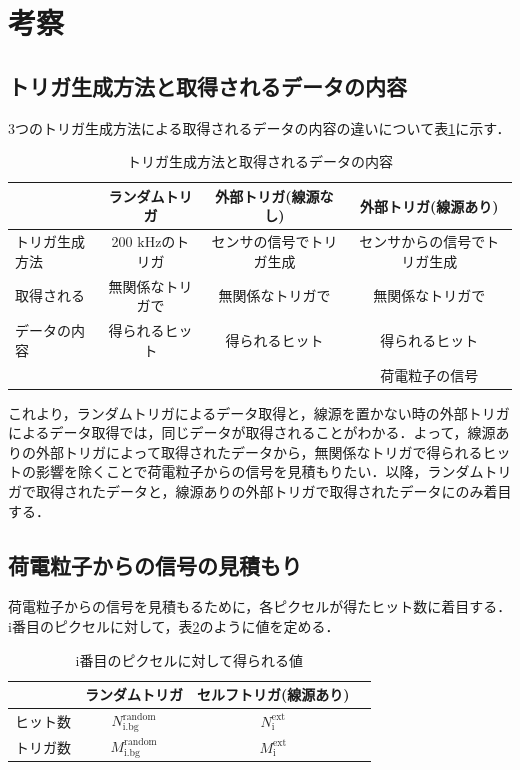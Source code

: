 \section{考察}
\label{sec:extsum}
\subsection*{トリガ生成方法と取得されるデータの内容}
3つのトリガ生成方法による取得されるデータの内容の違いについて表\ref{tab:extdata}に示す．

\begin{table}[h]
  \centering
  \caption{トリガ生成方法と取得されるデータの内容}
  \label{tab:extdata}
  \begin{tabular} {l|ccc} \hline 
    & ランダムトリガ & 外部トリガ(線源なし) & 外部トリガ(線源あり) \\ \hline \hline
    トリガ生成方法 & 200 $\mathrm{kHz}$のトリガ & センサの信号でトリガ生成 & センサからの信号でトリガ生成 \\ \hline
    取得される & 無関係なトリガで & 無関係なトリガで & 無関係なトリガで\\
    データの内容 & 得られるヒット & 得られるヒット & 得られるヒット \\
    & & & 荷電粒子の信号\\ \hline
  \end{tabular}
  \label{tab:extdata}
\end{table}

これより，ランダムトリガによるデータ取得と，線源を置かない時の外部トリガによるデータ取得では，同じデータが取得されることがわかる．よって，線源ありの外部トリガによって取得されたデータから，無関係なトリガで得られるヒットの影響を除くことで荷電粒子からの信号を見積もりたい．以降，ランダムトリガで取得されたデータと，線源ありの外部トリガで取得されたデータにのみ着目する．

\subsection*{荷電粒子からの信号の見積もり}
荷電粒子からの信号を見積もるために，各ピクセルが得たヒット数に着目する．i番目のピクセルに対して，表\ref{tab:extpara}のように値を定める．

\begin{table}[h]
  \centering
  \caption{i番目のピクセルに対して得られる値}
  \begin{tabular} {l|ccc} \hline
    & ランダムトリガ & セルフトリガ(線源あり) \\ \hline \hline
    ヒット数 & $N_{\mathrm{i.bg}}^{\mathrm{random}}$ & $N_{\mathrm{i}}^{\mathrm{ext}}$ \\
    トリガ数 & $M_{\mathrm{i.bg}}^{\mathrm{random}}$ & $M_{\mathrm{i}}^{\mathrm{ext}}$ \\ \hline
  \end{tabular}
  \label{tab:extpara}
\end{table}

